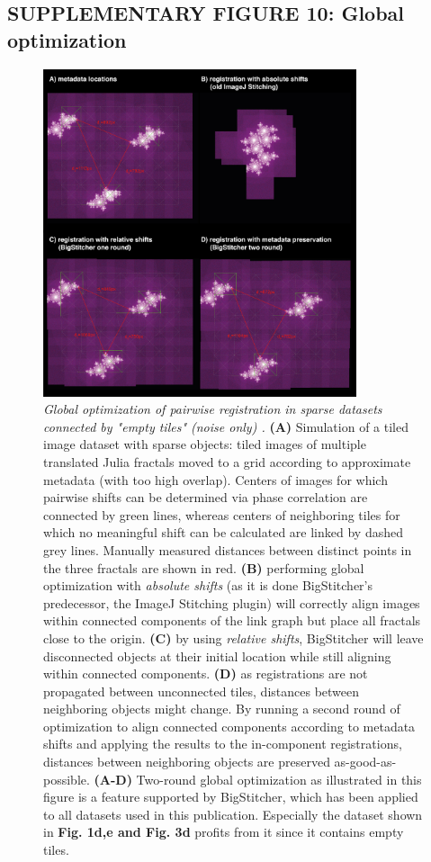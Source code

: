 \documentclass[]{spie}  %
\begin{document}
\pagebreak


\subsection*{SUPPLEMENTARY FIGURE 10: Global optimization}
\vspace{-3mm}
\begin{figure}[h!]
\centerline{\includegraphics[width=0.82\textwidth]{fig-globalopt.jpg}}
\vspace{2.0mm}
\caption{\hspace{-0.5mm} \emph{Global optimization of pairwise registration in sparse datasets connected by "empty tiles" (noise only) .} \textbf{(A)} Simulation of a tiled image dataset with sparse objects: tiled images of multiple translated Julia fractals moved to a grid according to approximate metadata (with too high overlap). Centers of images for which pairwise shifts can be determined via phase correlation are connected by green lines, whereas centers of neighboring tiles for which no meaningful shift can be calculated are linked by dashed grey lines. Manually measured distances between distinct points in the three fractals are shown in red. \textbf{(B)} performing global optimization with \emph{absolute shifts} (as it is done BigStitcher's predecessor, the ImageJ Stitching plugin) will correctly align images within connected components of the link graph but place all fractals close to the origin. \textbf{(C)} by using \emph{relative shifts}, BigStitcher will leave disconnected objects at their initial location while still aligning within connected components. \textbf{(D)} as registrations are not propagated between unconnected tiles, distances between neighboring objects might change. By running a second round of optimization to align connected components according to metadata shifts and applying the results to the in-component registrations, distances between neighboring objects are preserved as-good-as-possible. \textbf{(A-D)} Two-round global optimization as illustrated in this figure is a feature supported by BigStitcher, which has been applied to all datasets used in this publication. Especially the dataset shown in \textbf{Fig. 1d,e and Fig. 3d} profits from it since it contains empty tiles.
}
\end{figure}
\end{document}
